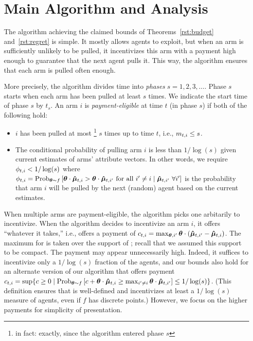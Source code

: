 \section{Main Algorithm and Analysis}
\label{sec:ub}
The algorithm achieving the claimed bounds of
Theorems~\ref{rst:budget} and~\ref{rst:regret} is simple.
It mostly allows agents to exploit, but when an arm is sufficiently
unlikely to be pulled,
it incentivizes this arm with a payment high enough
to guarantee that the next agent pulls it.
This way, the algorithm ensures that each arm is pulled often enough.

More precisely, the algorithm divides time into \emph{phases}
$s = 1, 2, 3, \ldots$.
Phase $s$ starts when each arm has been pulled at least $s$ times.
We indicate the start time of phase $s$ by $t_s$. An arm $i$ is \emph{payment-eligible} at time $t$ (in phase $s$)
if both of the following hold:

\begin{itemize}
\item $i$ has been pulled at most%
\footnote{in fact: exactly, since the algorithm entered phase $s$}
$s$ times up to time $t$, i.e., $m_{t,i} \leq s$.
\item 
The conditional probability of pulling arm $i$ is less than
$1/\log(s)$ given current estimates  of arms'
attribute vectors.  In other words, we require
$\phi_{t,i} < 1/\log(s)$ where 
$\PullProb{t}{i} = \Prob[\AgV \sim \AgentDist]{\AgV \cdot \ArmEV{t}{i} > \AgV
\cdot \ArmEV{t}{i'} \mbox{ for all } i' \neq i \mid \ArmEV{t}{i'}\ \forall i'}$
is the probability that arm $i$ will be pulled
by the next (random) agent based on the current estimates. 
\end{itemize}

When multiple arms are payment-eligible, the algorithm picks one arbitarily to incentivize.
When the algorithm decides to incentivize an arm $i$,
it offers ``whatever it takes,'' i.e., offers a payment of
$c_{t,i} = \max_{\bm{\theta},i'} \bm{\theta} \cdot (\bm{\hat{\mu}}_{t,i'} - \bm{\hat{\mu}}_{t,i})$.
The maximum for \AgV is taken over the support of \AgentDist;
recall that we assumed this support to be compact.
The payment  may appear unnecessarily high.
Indeed, it suffices to
incentivize only a $1/\log(s)$ fraction of the agents,
and our bounds also hold for an alternate version of our algorithm that 
offers payment
$\Pay{t}{i} = \sup \Set{c \geq 0}{%
\Prob[\AgV \sim \AgentDist]{c + \AgV \cdot \ArmEV{t}{i} \geq \max_{i'\ne i} \AgV \cdot \ArmEV{t}{i'}} \leq 1/\log(s)}$.
(This definition ensures that  is well-defined
and incentivizes at least a $1/\log(s)$ measure of agents,
even if $f$ has discrete points.)
However, we focus on the higher payments for simplicity of presentation.


